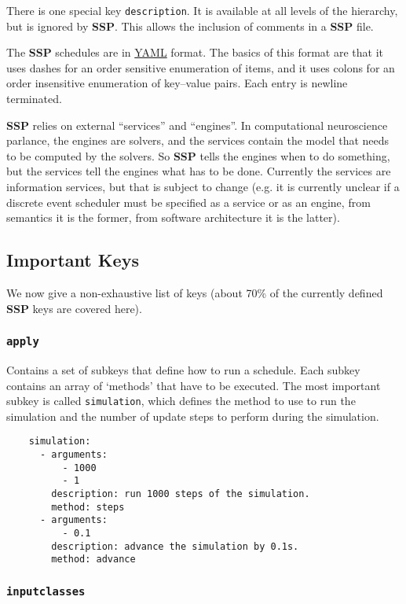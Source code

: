 \documentclass[12pt]{article}
\begin{document}
There is one special key {\tt description}. It is available at all levels of the hierarchy, but is ignored by {\bf SSP}. This allows the inclusion of comments in a {\bf SSP} file.

The {\bf SSP} schedules are in \href{http://fdik.org/yml/}{YAML} format. The basics of this format are that it uses dashes for an order sensitive enumeration of items, and it uses colons for an order insensitive enumeration of key--value pairs. Each entry is newline terminated.

{\bf SSP} relies on external ``services'' and ``engines''. In computational neuroscience parlance, the engines are solvers, and the services contain the model that needs to be computed by the solvers. So {\bf SSP} tells the engines when to do something, but the services tell the engines what has to be done. Currently the services are information services, but that is subject to change (e.g. it is currently unclear if a discrete event scheduler must be specified as a service or as an engine, from semantics it is the former, from software architecture it is the latter).

\subsection*{Important Keys}

We now give a non-exhaustive list of keys (about 70\% of the currently defined {\bf SSP} keys are covered here).

\subsubsection*{\tt apply}

Contains a set of subkeys that define how to run a schedule. Each subkey contains an array of `methods' that have to be executed. The most important subkey is called {\tt simulation}, which defines the method to use to run the simulation and the number of update steps to perform during the simulation. 
\begin{verbatim}
    simulation:
      - arguments:
          - 1000
          - 1
        description: run 1000 steps of the simulation.
        method: steps
      - arguments:
          - 0.1
        description: advance the simulation by 0.1s.
        method: advance
\end{verbatim}


\subsubsection*{\tt inputclasses}
\end{document}
